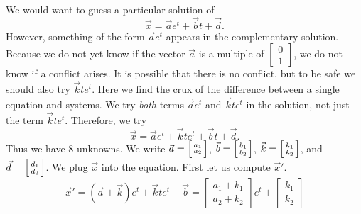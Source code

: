 \documentclass{ximera}
\begin{document}
\begin{exampleSol}
    We would want to guess a particular solution of
    \begin{equation*}
        \vec{x} =  \vec{a} e^{t} + \vec{b} t + \vec{d} .
    \end{equation*}
    However, something of the form $\vec{a} e^t$ appears in the complementary solution.  Because we do not yet know if the vector $\vec{a}$ is a multiple of 
    $\left[ \begin{smallmatrix}
        0 \\
        1
    \end{smallmatrix} \right]$, 
    we do not know if a conflict arises.  It is possible that there is no conflict, but to be safe we should also try $\vec{k} t e^t$. Here we find the crux of the difference between a single equation and systems.  We try \emph{both} terms $\vec{a} e^t$ and $\vec{k} t e^t$ in the solution, not just the term $\vec{k} t e^t$. Therefore, we try
    \begin{equation*}
        \vec{x} = \vec{a} e^{t} + \vec{k} t e^{t} + \vec{b} t + \vec{d}.
    \end{equation*}
    Thus we have 8 unknowns.  We write
    $\vec{a} = \Bigl[ \begin{smallmatrix} a_1 \\ a_2 \end{smallmatrix} \Bigr]$,
    $\vec{b} = \Bigl[ \begin{smallmatrix} b_1 \\ b_2 \end{smallmatrix} \Bigr]$,
    $\vec{k} = \Bigl[ \begin{smallmatrix} k_1 \\ k_2 \end{smallmatrix} \Bigr]$,
    and
    $\vec{d} = \Bigl[ \begin{smallmatrix} d_1 \\ d_2 \end{smallmatrix} \Bigr]$.
    We plug $\vec{x}$ into the equation.  First let us compute ${\vec{x}}'$.
    \begin{equation*}
        {\vec{x}}' =  \left( \vec{a} + \vec{k} \right) e^{t} + \vec{k} t e^{t} + \vec{b} =
        \begin{bmatrix}
            a_1 + k_1 \\ 
            a_2+k_2
        \end{bmatrix}
        e^{t} +
        \begin{bmatrix}
            k_1 \\ 
            k_2
        \end{bmatrix}

\end{equation*}
\end{exampleSol}
\end{document}
